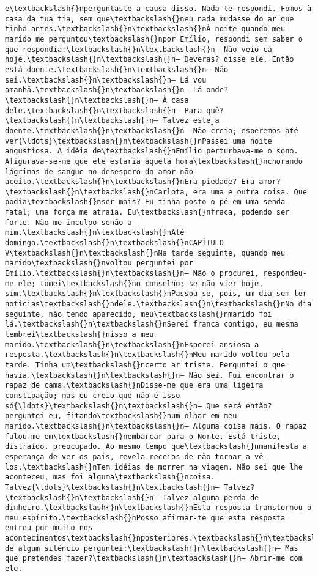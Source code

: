 \documentclass[11pt]{article}
\begin{document}
\begin{Verbatim}[commandchars=\\\{\}]
e\textbackslash{}nperguntaste a causa disso. Nada te respondi. Fomos à casa da tua tia, sem que\textbackslash{}neu nada mudasse do ar que tinha antes.\textbackslash{}n\textbackslash{}nÀ noite quando meu marido me perguntou\textbackslash{}npor Emílio, respondi sem saber o que respondia:\textbackslash{}n\textbackslash{}n— Não veio cá hoje.\textbackslash{}n\textbackslash{}n— Deveras? disse ele. Então está doente.\textbackslash{}n\textbackslash{}n— Não sei.\textbackslash{}n\textbackslash{}n— Lá vou amanhã.\textbackslash{}n\textbackslash{}n— Lá onde?\textbackslash{}n\textbackslash{}n— À casa dele.\textbackslash{}n\textbackslash{}n— Para quê?\textbackslash{}n\textbackslash{}n— Talvez esteja doente.\textbackslash{}n\textbackslash{}n— Não creio; esperemos até ver{\ldots}\textbackslash{}n\textbackslash{}nPassei uma noite angustiosa. A idéia de\textbackslash{}nEmílio perturbava-me o sono. Afigurava-se-me que ele estaria àquela hora\textbackslash{}nchorando lágrimas de sangue no desespero do amor não aceito.\textbackslash{}n\textbackslash{}nEra piedade? Era amor?\textbackslash{}n\textbackslash{}nCarlota, era uma e outra coisa. Que podia\textbackslash{}nser mais? Eu tinha posto o pé em uma senda fatal; uma força me atraía. Eu\textbackslash{}nfraca, podendo ser forte. Não me inculpo senão a mim.\textbackslash{}n\textbackslash{}nAté domingo.\textbackslash{}n\textbackslash{}nCAPÍTULO V\textbackslash{}n\textbackslash{}nNa tarde seguinte, quando meu marido\textbackslash{}nvoltou perguntei por Emílio.\textbackslash{}n\textbackslash{}n— Não o procurei, respondeu-me ele; tomei\textbackslash{}no conselho; se não vier hoje, sim.\textbackslash{}n\textbackslash{}nPassou-se, pois, um dia sem ter notícias\textbackslash{}ndele.\textbackslash{}n\textbackslash{}nNo dia seguinte, não tendo aparecido, meu\textbackslash{}nmarido foi lá.\textbackslash{}n\textbackslash{}nSerei franca contigo, eu mesma lembrei\textbackslash{}nisso a meu marido.\textbackslash{}n\textbackslash{}nEsperei ansiosa a resposta.\textbackslash{}n\textbackslash{}nMeu marido voltou pela tarde. Tinha um\textbackslash{}ncerto ar triste. Perguntei o que havia.\textbackslash{}n\textbackslash{}n— Não sei. Fui encontrar o rapaz de cama.\textbackslash{}nDisse-me que era uma ligeira constipação; mas eu creio que não é isso só{\ldots}\textbackslash{}n\textbackslash{}n— Que será então? perguntei eu, fitando\textbackslash{}num olhar em meu marido.\textbackslash{}n\textbackslash{}n— Alguma coisa mais. O rapaz falou-me em\textbackslash{}nembarcar para o Norte. Está triste, distraído, preocupado. Ao mesmo tempo que\textbackslash{}nmanifesta a esperança de ver os pais, revela receios de não tornar a vê-los.\textbackslash{}nTem idéias de morrer na viagem. Não sei que lhe aconteceu, mas foi alguma\textbackslash{}ncoisa. Talvez{\ldots}\textbackslash{}n\textbackslash{}n— Talvez?\textbackslash{}n\textbackslash{}n— Talvez alguma perda de dinheiro.\textbackslash{}n\textbackslash{}nEsta resposta transtornou o meu espírito.\textbackslash{}nPosso afirmar-te que esta resposta entrou por muito nos acontecimentos\textbackslash{}nposteriores.\textbackslash{}n\textbackslash{}nDepois de algum silêncio perguntei:\textbackslash{}n\textbackslash{}n— Mas que pretendes fazer?\textbackslash{}n\textbackslash{}n— Abrir-me com ele. 
\end{Verbatim}
\end{document}
